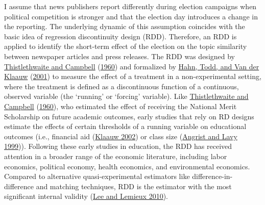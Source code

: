 \documentclass[
  12pt,
]{article}
\begin{document}
I assume that news publishers report differently during election
campaigns when political competition is stronger and that the election
day introduces a change in the reporting. The underlying dynamic of this
assumption coincides with the basic idea of regression discontinuity
design (RDD). Therefore, an RDD is applied to identify the short-term
effect of the election on the topic similarity between newspaper
articles and press releases. The RDD was designed by
\protect\hyperlink{ref-thistlethwaite_regression-discontinuity_1960}{Thistlethwaite
and Campbell}
(\protect\hyperlink{ref-thistlethwaite_regression-discontinuity_1960}{1960})
and formalized by \protect\hyperlink{ref-hahn_identification_2001}{Hahn,
Todd, and Van der Klaauw}
(\protect\hyperlink{ref-hahn_identification_2001}{2001}) to measure the
effect of a treatment in a non-experimental setting, where the treatment
is defined as a discontinuous function of a continuous, observed
variable (the `running' or `forcing' variable). Like
\protect\hyperlink{ref-thistlethwaite_regression-discontinuity_1960}{Thistlethwaite
and Campbell}
(\protect\hyperlink{ref-thistlethwaite_regression-discontinuity_1960}{1960}),
who estimated the effect of receiving the National Merit Scholarship on
future academic outcomes, early studies that rely on RD designs estimate
the effects of certain thresholds of a running variable on educational
outcomes (i.e., financial aid
(\protect\hyperlink{ref-van_der_klaauw_estimating_2002}{Klaauw 2002}) or
class size (\protect\hyperlink{ref-angrist_using_1999}{Angrist and Lavy
1999})). Following these early studies in education, the RDD has
received attention in a broader range of the economic literature,
including labor economics, political economy, health economics, and
environmental economics. Compared to alternative quasi-experimental
estimators like difference-in-difference and matching techniques, RDD is
the estimator with the most significant internal validity
(\protect\hyperlink{ref-lee_regression_2010}{Lee and Lemieux 2010}).
\end{document}
